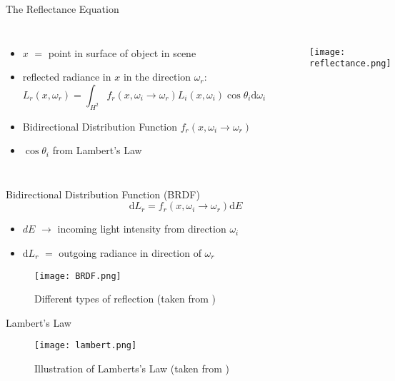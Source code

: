 \begin{frame}{The Reflectance Equation}
\begin{columns}
\begin{itemize}
    \item<1-> $x$ $=$ point in surface of object in scene
    \item<2-> reflected radiance in $x$ in the direction $\omega_r$: 
    \begin{equation}
L_r(x, \omega_r) = \int_{H^2} f_r(x, \omega_i \rightarrow \omega_r) L_i(x, \omega_i) \cos \theta_i \mathrm{d}\omega_i
\end{equation}
    \item<4-> Bidirectional Distribution Function $f_r(x, \omega_i \rightarrow \omega_r) $
    \item<4-> $\cos \theta_i$ from Lambert's Law
\end{itemize}
\begin{figure}
\texttt{[image: reflectance.png]}
\end{figure}
\end{columns}
\end{frame}

\begin{frame}{Bidirectional Distribution Function (BRDF)}
\begin{equation}
\mathrm{d}L_r = f_r(x, \omega_i \rightarrow \omega_r) \mathrm{d}E
\end{equation}
\begin{itemize}
	\pause
    \item  $dE$ $\rightarrow$ incoming light intensity from direction $\omega_i$ 
    \pause
    \item $\mathrm{d}L_r$ $=$ outgoing radiance in direction of $\omega_r$
    \pause
\end{itemize}
\begin{center}
\begin{figure}
\texttt{[image: BRDF.png]}
\caption{Different types of reflection (taken from \cite{Bungartz.2014})}
\end{figure}
\end{center}
\end{frame}

\begin{frame}{Lambert's Law}
\begin{center}
\begin{figure}
    \texttt{[image: lambert.png]}
    \caption{Illustration of Lamberts's Law (taken from \cite{Pharr.2023})}
\end{figure}
\end{center}
\end{frame}

